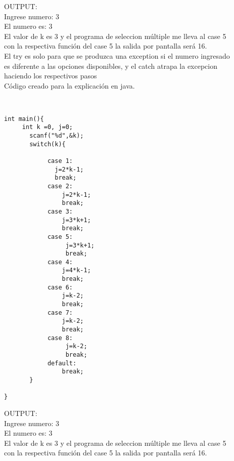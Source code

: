OUTPUT:\\
	Ingrese numero: 3\\
	El numero es: 3\\
	El valor de k es 3 y el programa de seleccion múltiple me lleva al case 5 \\
	con la respectiva función del case 5 la salida por pantalla será 16.\\
	El try es solo para que se produzca una exception si el numero ingresado\\
	es diferente a las opciones disponibles, y el catch atrapa la excepcion\\
	haciendo los respectivos pasos \\
 




\lstset{language = c}  %
Código creado para la explicación en java.
\begin{lstlisting}[frame = single] %Comienzo del Código


int main(){
     int k =0, j=0;
       scanf("%d",&k);
       switch(k){
               
            case 1:
              j=2*k-1;
              break;
            case 2:
                j=2*k-1;
                break;
            case 3:
                j=3*k+1;
                break;
            case 5:
                 j=3*k+1;
                 break;
            case 4:
                j=4*k-1;
                break;
            case 6:
                j=k-2;
                break;
            case 7:
                j=k-2;
                break;
            case 8:
                 j=k-2;
                 break;
            default:
                break;
       }
     
}

\end{lstlisting}

OUTPUT:\\
	Ingrese numero: 3\\
	El numero es: 3\\
	El valor de k es 3 y el programa de seleccion múltiple me lleva al case 5 \\
	con la respectiva función del case 5 la salida por pantalla será 16.\\
	
